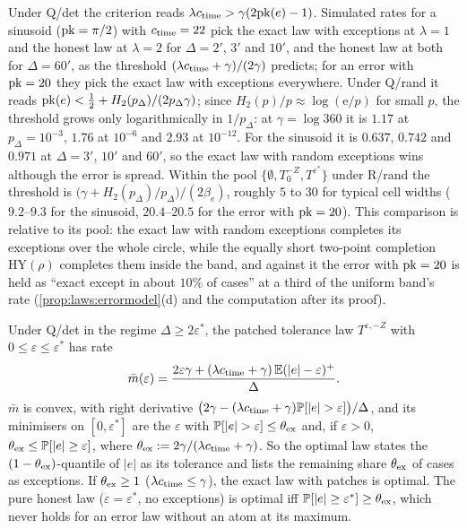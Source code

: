 Under Q/det the criterion reads $\lambda c_{\rm time}>\gamma(2\mathrm{pk}(e)-1)$. Simulated rates for a sinusoid ($\mathrm{pk}=\pi/2$) with $c_{\rm time}=22$ pick the exact law with exceptions at $\lambda=1$ and the honest law at $\lambda=2$ for $\Delta=2'$, $3'$ and $10'$, and the honest law at both for $\Delta=60'$, as the threshold $(\lambda c_{\rm time}+\gamma)/(2\gamma)$ predicts; for an error with $\mathrm{pk}=20$ they pick the exact law with exceptions everywhere. Under Q/rand it reads $\mathrm{pk}(e)<\frac12+H_2(p_\Delta)/(2p_\Delta\gamma)$; since $H_2(p)/p\approx\log(\mathrm e/p)$ for small $p$, the threshold grows only logarithmically in $1/p_\Delta$: at $\gamma=\log360$ it is $1.17$ at $p_\Delta=10^{-3}$, $1.76$ at $10^{-6}$ and $2.93$ at $10^{-12}$. For the sinusoid it is $0.637$, $0.742$ and $0.971$ at $\Delta=3'$, $10'$ and $60'$, so the exact law with random exceptions wins although the error is spread. Within the pool $\{\emptyset,T_0^{-Z},T^{\varepsilon^*}\}$ under R/rand the threshold is $\big(\gamma+H_2(p_\Delta)/p_\Delta\big)/(2\beta_e)$, roughly $5$ to $30$ for typical cell widths ($9.2$--$9.3$ for the sinusoid, $20.4$--$20.5$ for the error with $\mathrm{pk}=20$). This comparison is relative to its pool: the exact law with random exceptions completes its exceptions over the whole circle, while the equally short two-point completion $\mathrm{HY}(\rho)$ completes them inside the band, and against it the error with $\mathrm{pk}=20$ is held as ``exact except in about $10\%$ of cases'' at a third of the uniform band's rate (\cref{prop:laws:errormodel}(d) and the computation after its proof).

\begin{proposition}\label{prop:laws:quantile}
Under Q/det in the regime $\Delta\ge2\varepsilon^*$, the patched tolerance law $T^{\varepsilon,-Z}$ with $0\le\varepsilon\le\varepsilon^*$ has rate
\[\bar m(\varepsilon)=\frac{2\varepsilon\gamma+(\lambda c_{\rm time}+\gamma)\,\mathbb{E}(\lvert e\rvert-\varepsilon)^+}{\Delta}.\]
$\bar m$ is convex, with right derivative $\big(2\gamma-(\lambda c_{\rm time}+\gamma)\mathbb{P}[\lvert e\rvert>\varepsilon]\big)/\Delta$, and its minimisers on $[0,\varepsilon^*]$ are the $\varepsilon$ with $\mathbb{P}[\lvert e\rvert>\varepsilon]\le\theta_{\rm ex}$ and, if $\varepsilon>0$, $\theta_{\rm ex}\le\mathbb{P}[\lvert e\rvert\ge\varepsilon]$, where $\theta_{\rm ex}:=2\gamma/(\lambda c_{\rm time}+\gamma)$. So the optimal law states the $(1-\theta_{\rm ex})$-quantile of $\lvert e\rvert$ as its tolerance and lists the remaining share $\theta_{\rm ex}$ of cases as exceptions. If $\theta_{\rm ex}\ge1$ ($\lambda c_{\rm time}\le\gamma$), the exact law with patches is optimal. The pure honest law ($\varepsilon=\varepsilon^*$, no exceptions) is optimal iff $\mathbb{P}[\lvert e\rvert\ge\varepsilon^*]\ge\theta_{\rm ex}$, which never holds for an error law without an atom at its maximum.
\end{proposition}

